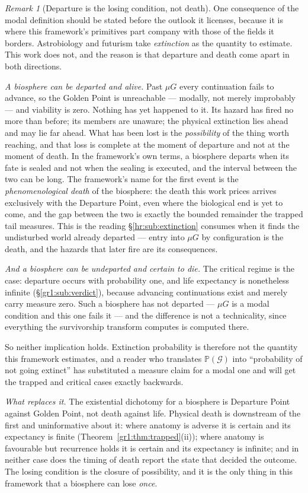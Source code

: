 \documentclass[11pt]{article}
\numberwithin{equation}{section}
\theoremstyle{plain}
\theoremstyle{definition}
\theoremstyle{remark}
\newtheorem{remark}[theorem]{Remark}
\newcommand{\PP}{\mathbb{P}}
\begin{document}
\begin{remark}[Departure is the losing condition, not death]
\label{ac:rem:losingcondition}
One consequence of the modal definition should be stated before the
outlook it licenses, because it is where this framework's primitives
part company with those of the fields it borders. Astrobiology and
futurism take \emph{extinction} as the quantity to estimate. This work
does not, and the reason is that departure and death come apart in both
directions.

\emph{A biosphere can be departed and alive.} Past $\mu G$ every
continuation fails to advance, so the Golden Point is unreachable ---
modally, not merely improbably --- and viability is zero. Nothing has yet
happened to it. Its hazard has fired no more than before; its members
are unaware; the physical extinction lies ahead and may lie far ahead.
What has been lost is the \emph{possibility} of the thing worth
reaching, and that loss is complete at the moment of departure and not
at the moment of death. In the framework's own terms, a biosphere
departs when its fate is sealed and not when the sealing is executed,
and the interval between the two can be long. The framework's name for the
first event is the \emph{phenomenological death} of the biosphere: the
death this work prices arrives exclusively with the Departure Point,
even where the biological end is yet to come, and the gap between the
two is exactly the bounded remainder the trapped tail measures. This is
the reading \S\ref{hr:sub:extinction} consumes when it finds the
undisturbed world already departed --- entry into $\mu G$ by
configuration is the death, and the hazards that later fire are its
consequences.

\emph{And a biosphere can be undeparted and certain to die.} The
critical regime is the case: departure occurs with probability one, and
life expectancy is nonetheless infinite (\S\ref{gr1:sub:verdict}),
because advancing continuations exist and merely carry measure zero.
Such a biosphere has not departed --- $\mu G$ is a modal condition and
this one fails it --- and the difference is not a technicality, since
everything the survivorship transform computes is computed there.

So neither implication holds. Extinction probability is therefore not
the quantity this framework estimates, and a reader who translates
$\PP(\mathcal G)$ into ``probability of not going extinct'' has
substituted a measure claim for a modal one and will get the trapped and
critical cases exactly backwards.

\emph{What replaces it.} The existential dichotomy for a biosphere is
Departure Point against Golden Point, not death against life. Physical
death is downstream of the first and uninformative about it: where
anatomy is adverse it is certain and its expectancy is finite
(Theorem~\ref{gr1:thm:trapped}(ii)); where anatomy is favourable but
recurrence holds it is certain and its expectancy is infinite; and in
neither case does the timing of death report the state that decided the
outcome. The losing condition is the closure of possibility, and it is
the only thing in this framework that a biosphere can lose \emph{once}.
\end{remark}
\end{document}
